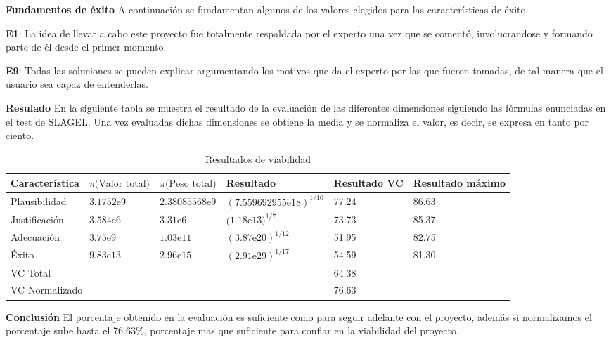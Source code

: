 \textbf{Fundamentos de éxito}
A continuación se fundamentan algunos de los valores elegidos para las características de éxito.

\begin{compactitem}
  \item[\textbf{E1}:] La idea de llevar a cabo este proyecto fue totalmente respaldada
     por el experto una vez que se comentó, involucrandose y formando parte de él desde
     el primer momento.
  \item[\textbf{E9}:] Todas las soluciones se pueden explicar argumentando los motivos
     que da el experto por las que fueron tomadas, de tal manera que el usuario sea
     capaz de entenderlas.
\end{compactitem}


\textbf{Resulado}
En la siguiente tabla se muestra el resultado de la evaluación de las diferentes dimensiones
 siguiendo las fórmulas enunciadas en el test de SLAGEL. Una vez evaluadas dichas dimensiones
 se obtiene la media y se normaliza el valor, es decir, se expresa en tanto por ciento.

\begin{table}[htb]%
  \centering
  \caption{Resultados de viabilidad}
  \label{tab:anchura}
  \begin{tabular}{ | l | l | l | l | p{1.5cm} | p{1.5cm} | }
    \hline
    Característica & $\pi\text{(Valor total)}$ & $\pi\text{(Peso total)}$ & Resultado & Resultado VC & Resultado máximo \\ \hline \hline
    Plausibilidad & $3.1752\text{e}9$ & $2.38085568\text{e}9$ & $(7.559692955\text{e}18)^{1/10}$ & 77.24 & 86.63 \\ \hline
    Justificación & $3.584\text{e}6$  & $3.31\text{e}6$ & ($1.18\text{e}13)^{1/7}$ & 73.73 & 85.37 \\ \hline
    Adecuación & $3.75\text{e}9$ & $1.03\text{e}11$ & $(3.87\text{e}20)^{1/12}$ & 51.95 & 82.75 \\ \hline
    Éxito & $9.83\text{e}13$ & $2.96\text{e}15$ & $(2.91\text{e}29)^{1/17}$ & 54.59 & 81.30 \\ \hline \hline
    \multicolumn{4}{|l|}{VC Total} & \multicolumn{2}{l|}{64.38} \\ \hline
    \multicolumn{4}{|l|}{VC Normalizado} & \multicolumn{2}{l|}{76.63} \\ \hline

  \end{tabular}
\end{table}

\textbf{Conclusión}
El porcentaje obtenido en la evaluación es suficiente como para seguir adelante
 con el proyecto, además si normalizamos el porcentaje sube hasta el 76.63\%, porcentaje
 mas que suficiente para confiar en la viabilidad del proyecto.

